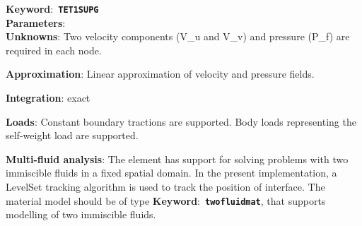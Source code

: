 \documentclass[a4paper]{article}
\newcommand{\descitem}[1]{{\noindent \bf #1}:}
\newcommand{\elemkeyword}[1]{\descitem{Keyword}~{\bf \texttt{#1}}}
\begin{document}
\elemkeyword{TET1SUPG}\\
\descitem{Parameters} \\
\descitem{Unknowns}
Two velocity components (V\_u and V\_v) and pressure (P\_f) are required in each node.

\descitem{Approximation} Linear approximation of velocity and pressure
fields.

\descitem{Integration}
exact

\descitem{Loads} Constant boundary tractions are supported. Body loads
representing the self-weight load are supported.

\descitem{Multi-fluid analysis} The element has support for solving
problems with two immiscible fluids in
a fixed spatial domain. In the present implementation, a LevelSet tracking algorithm
is used to track the position of interface. 
The material model should be of type \elemkeyword{twofluidmat}, that
supports modelling of two immiscible fluids.
\end{document}
